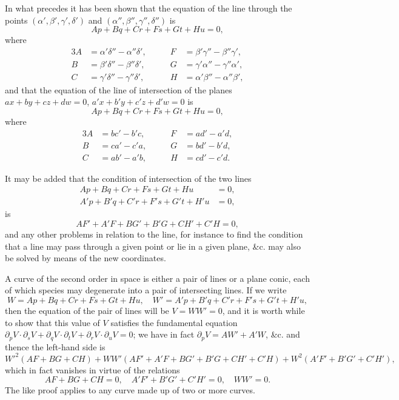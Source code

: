 \documentclass[11pt,a4paper]{article}
\theoremstyle{plain}
\begin{document}
In what precedes it has been shown that the equation of the line through the points $(\alpha', \beta', \gamma', \delta')$ and $(\alpha'', \beta'', \gamma'', \delta'')$ is
\[
Ap + Bq + Cr + Fs + Gt + Hu = 0,
\]
where
\begin{alignat*}{3}
A &= \alpha'\delta'' - \alpha''\delta', &\qquad F &= \beta'\gamma'' - \beta''\gamma',\\
B &= \beta'\delta'' - \beta''\delta', &\qquad G &= \gamma'\alpha'' - \gamma''\alpha',\\
C &= \gamma'\delta'' - \gamma''\delta', &\qquad H &= \alpha'\beta'' - \alpha''\beta',
\end{alignat*}
and that the equation of the line of intersection of the planes $ax + by + cz + dw = 0$, $a'x + b'y + c'z + d'w = 0$ is
\[
Ap + Bq + Cr + Fs + Gt + Hu = 0,
\]
where
\begin{alignat*}{3}
A &= bc' - b'c, &\qquad F &= ad' - a'd,\\
B &= ca' - c'a, &\qquad G &= bd' - b'd,\\
C &= ab' - a'b, &\qquad H &= cd' - c'd.
\end{alignat*}

It may be added that the condition of intersection of the two lines
\begin{align*}
Ap + Bq + Cr + Fs + Gt + Hu &= 0,\\
A'p + B'q + C'r + F's + G't + H'u &= 0,
\end{align*}
is
\[
AF' + A'F + BG' + B'G + CH' + C'H = 0,
\]
and any other problems in relation to the line, for instance to find the condition that a line may pass through a given point or lie in a given plane, \&c. may also be solved by means of the new coordinates.

A curve of the second order in space is either a pair of lines or a plane conic, each of which species may degenerate into a pair of intersecting lines. If we write
\[
W = Ap + Bq + Cr + Fs + Gt + Hu,\quad W' = A'p + B'q + C'r + F's + G't + H'u,
\]
then the equation of the pair of lines will be $V = WW' = 0$, and it is worth while to show that this value of $V$ satisfies the fundamental equation $\partial_p V \cdot \partial_s V + \partial_q V \cdot \partial_t V + \partial_r V \cdot \partial_u V = 0$; we have in fact $\partial_p V = AW' + A'W$, \&c. and thence the left-hand side is
\[
W'^2(AF + BG + CH) + WW'(AF' + A'F + BG' + B'G + CH' + C'H) + W^2(A'F' + B'G' + C'H'),
\]
which in fact vanishes in virtue of the relations
\[
AF + BG + CH = 0,\quad A'F' + B'G' + C'H' = 0,\quad WW' = 0.
\]
The like proof applies to any curve made up of two or more curves.
\end{document}
